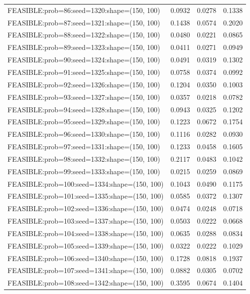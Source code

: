 \begin{longtable}{lccc}
FEASIBLE:prob=86:seed=1320:shape=(150, 100)  & 0.0932 & 0.0278 & 0.1338 \\
FEASIBLE:prob=87:seed=1321:shape=(150, 100)  & 0.1438 & 0.0574 & 0.2020 \\
FEASIBLE:prob=88:seed=1322:shape=(150, 100)  & 0.0480 & 0.0221 & 0.0865 \\
FEASIBLE:prob=89:seed=1323:shape=(150, 100)  & 0.0411 & 0.0271 & 0.0949 \\
FEASIBLE:prob=90:seed=1324:shape=(150, 100)  & 0.0491 & 0.0319 & 0.1302 \\
FEASIBLE:prob=91:seed=1325:shape=(150, 100)  & 0.0758 & 0.0374 & 0.0992 \\
FEASIBLE:prob=92:seed=1326:shape=(150, 100)  & 0.1204 & 0.0350 & 0.1003 \\
FEASIBLE:prob=93:seed=1327:shape=(150, 100)  & 0.0357 & 0.0218 & 0.0782 \\
FEASIBLE:prob=94:seed=1328:shape=(150, 100)  & 0.0943 & 0.0325 & 0.1202 \\
FEASIBLE:prob=95:seed=1329:shape=(150, 100)  & 0.1223 & 0.0672 & 0.1754 \\
FEASIBLE:prob=96:seed=1330:shape=(150, 100)  & 0.1116 & 0.0282 & 0.0930 \\
FEASIBLE:prob=97:seed=1331:shape=(150, 100)  & 0.1233 & 0.0458 & 0.1605 \\
FEASIBLE:prob=98:seed=1332:shape=(150, 100)  & 0.2117 & 0.0483 & 0.1042 \\
FEASIBLE:prob=99:seed=1333:shape=(150, 100)  & 0.0215 & 0.0259 & 0.0869 \\
FEASIBLE:prob=100:seed=1334:shape=(150, 100) & 0.1043 & 0.0490 & 0.1175 \\
FEASIBLE:prob=101:seed=1335:shape=(150, 100) & 0.0585 & 0.0372 & 0.1307 \\
FEASIBLE:prob=102:seed=1336:shape=(150, 100) & 0.0474 & 0.0248 & 0.0718 \\
FEASIBLE:prob=103:seed=1337:shape=(150, 100) & 0.0503 & 0.0222 & 0.0668 \\
FEASIBLE:prob=104:seed=1338:shape=(150, 100) & 0.0635 & 0.0288 & 0.0834 \\
FEASIBLE:prob=105:seed=1339:shape=(150, 100) & 0.0322 & 0.0222 & 0.1029 \\
FEASIBLE:prob=106:seed=1340:shape=(150, 100) & 0.1728 & 0.0818 & 0.1937 \\
FEASIBLE:prob=107:seed=1341:shape=(150, 100) & 0.0882 & 0.0305 & 0.0702 \\
FEASIBLE:prob=108:seed=1342:shape=(150, 100) & 0.3595 & 0.0674 & 0.1404 \\

\end{longtable}
